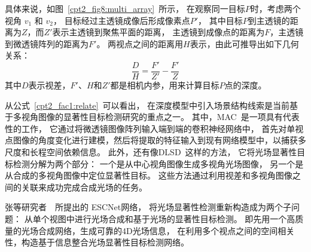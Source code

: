 具体来说，如图~\ref{cpt2_fig8:multi_array}~所示，
在观察同一目标$P$时，考虑两个视角 $v_{1}$ 和 $v_{2}$，
目标经过主透镜成像后形成像素点$P'$，
其中目标$P$到主透镜的距离为$Z$，而$Z'$表示主透镜到聚焦平面的距离，
主透镜到成像点的距离为$F$，主透镜到微透镜阵列的距离为$F'$。
两视点之间的距离用$H$表示，由此可推导出如下几何关系：
%
%
\begin{equation}
	\frac{D}{H} = \frac{F'}{Z'} - \frac{F'}{Z} 
	\label{cpt2_fac1:relate}
\end{equation}
%
%
其中$D$表示视差，$F'$、$H$和$Z'$都是相机内参，用来计算目标$P$点的深度。\par
%
%

%
%
%
%
从公式~\ref{cpt2_fac1:relate}~可以看出，
在深度模型中引入场景结构线索是当前基于多视角图像的显著性目标检测研究的重点之一。
其中，MAC~\cite{zhang2020light}是一项具有代表性的工作，
它通过将微透镜图像阵列输入端到端的卷积神经网络中，
首先对单视点图像的角度变化进行建模，然后将提取的特征输入到现有网络模型中，以捕获多尺度和长程空间依赖信息。
%
%
%
此外，还有像DLSD~\cite{piao2019deep}这样的方法，
它将光场显著性目标检测分解为两个部分：
一个是从中心视角图像生成多视角光场图像，
另一个是从合成的多视角图像中定位显著性目标。
这些方法通过利用视差和多视角图像之间的关联来成功完成合成光场的任务。
%
%
%
%
%
%
%




张等研究者~\cite{zhang2022exploring}~所提出的 ESCNet网络，
将光场显著性检测重新构造成为两个子问题：
从单个视图中进行光场合成和基于光场的显著性目标检测。
即先用一个高质量的光场合成网络，生成可靠的4D光场信息，
在利用多个视点之间的空间相关性，构造基于信息整合光场显著性目标检测网络。

















